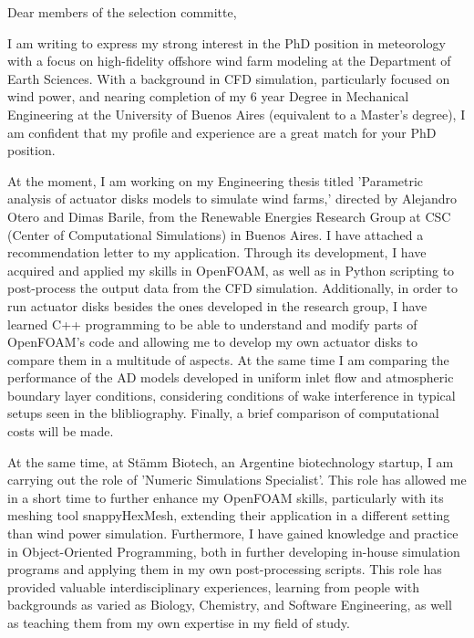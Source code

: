 \documentclass{letter}
\newcommand{\thesisname}{Parametric analysis of actuator disks models to simulate wind farms}
\begin{document}
\begin{letter}{}
\opening{Dear members of the selection committe,}

I am writing to express my strong interest in the PhD position in meteorology with a focus on high-fidelity offshore wind farm modeling at the Department of Earth Sciences.
  With a background in CFD simulation, particularly focused on wind power, and nearing completion of my 6 year Degree in Mechanical Engineering at the University of Buenos Aires (equivalent to a Master's degree), I am confident that my profile and experience are a great match for your PhD position.

At the moment, I am working on my Engineering thesis titled '\thesisname,' directed by Alejandro Otero and Dimas Barile, from the Renewable Energies Research Group at CSC (Center of Computational Simulations) in Buenos Aires. 
  I have attached a recommendation letter to my application. 
  Through its development, I have acquired and applied my skills in OpenFOAM, as well as in Python scripting to post-process the output data from the CFD simulation. 
  Additionally, in order to run actuator disks besides the ones developed in the research group, I have learned C++ programming to be able to understand and modify parts of OpenFOAM's code and allowing me to develop my own actuator disks to compare them in a multitude of aspects.
  At the same time I am comparing the performance of the AD models developed in uniform inlet flow and atmospheric boundary layer conditions, considering conditions of wake interference in typical setups seen in the blibliography.
  Finally, a brief comparison of computational costs will be made.

At the same time, at Stämm Biotech, an Argentine biotechnology startup, I am carrying out the role of 'Numeric Simulations Specialist'. 
  This role has allowed me in a short time to further enhance my OpenFOAM skills, particularly with its meshing tool snappyHexMesh, extending their application in a different setting than wind power simulation. 
  Furthermore, I have gained knowledge and practice in Object-Oriented Programming, both in further developing in-house simulation programs and applying them in my own post-processing scripts. 
  This role has provided valuable interdisciplinary experiences, learning from people with backgrounds as varied as Biology, Chemistry, and Software Engineering, as well as teaching them from my own expertise in my field of study.


\end{letter}
\end{document}
